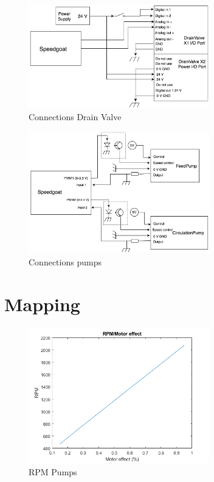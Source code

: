 \begin{figure}[h]
    \centering
    \includegraphics[width=0.7\textwidth]{ValveConn}
    \caption{Connections Drain Valve}
    \label{fig:ValveConn}
\end{figure}

\begin{figure}[h]
    \centering
    \includegraphics[width=0.7\textwidth]{PumpConn}
    \caption{Connections pumps}
    \label{fig:PumpConn}
\end{figure}


\section{Mapping}
\begin{figure}[h]
    \centering
    \includegraphics[width=0.7\textwidth]{RPM.png}
    \caption{RPM Pumps}
    \label{fig:RPM}
\end{figure}


